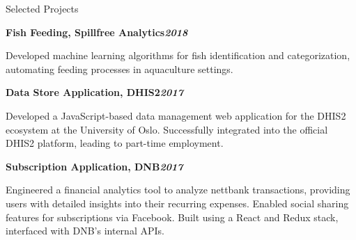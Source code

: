 \begin{rubric}{Selected Projects}
\begin{compactitem}
\vspace{-12pt}
\end{compactitem}
%
\entry*[]%
\textbf{Fish Feeding, Spillfree Analytics\hfill\textit{2018}} \par
\begin{compactitem}
\item Developed machine learning algorithms for fish identification and categorization, automating feeding processes in aquaculture settings.
\vspace{-12pt}
\end{compactitem}
%
\entry*[]%
\textbf{Data Store Application, DHIS2\hfill\textit{2017}} \par
\begin{compactitem}
\item Developed a JavaScript-based data management web application for the DHIS2 ecosystem at the University of Oslo. Successfully integrated into the official DHIS2 platform, leading to part-time employment.
\vspace{-12pt}
\end{compactitem}
%
\entry*[]%
\textbf{Subscription Application, DNB\hfill\textit{2017}} \par
\begin{compactitem}
\item Engineered a financial analytics tool to analyze nettbank transactions, providing users with detailed insights into their recurring expenses. Enabled social sharing features for subscriptions via Facebook. Built using a React and Redux stack, interfaced with DNB's internal APIs.
\vspace{-12pt}
\end{compactitem}
%
\end{rubric}